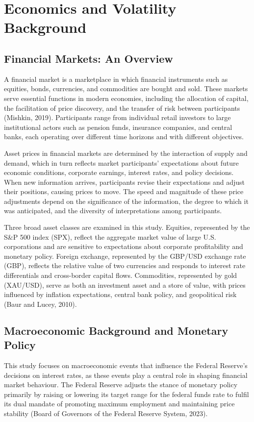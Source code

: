 \documentclass[12pt,a4paper]{report}
\begin{document}
\section{Economics and Volatility Background}
\subsection{Financial Markets: An Overview}
A financial market is a marketplace in which financial instruments such as equities, bonds, currencies, and commodities are bought and sold. These markets serve essential functions in modern economies, including the allocation of capital, the facilitation of price discovery, and the transfer of risk between participants (Mishkin, 2019). Participants range from individual retail investors to large institutional actors such as pension funds, insurance companies, and central banks, each operating over different time horizons and with different objectives.

Asset prices in financial markets are determined by the interaction of supply and demand, which in turn reflects market participants' expectations about future economic conditions, corporate earnings, interest rates, and policy decisions. When new information arrives, participants revise their expectations and adjust their positions, causing prices to move. The speed and magnitude of these price adjustments depend on the significance of the information, the degree to which it was anticipated, and the diversity of interpretations among participants.

Three broad asset classes are examined in this study. Equities, represented by the S\&P 500 index (SPX), reflect the aggregate market value of large U.S. corporations and are sensitive to expectations about corporate profitability and monetary policy. Foreign exchange, represented by the GBP/USD exchange rate (GBP), reflects the relative value of two currencies and responds to interest rate differentials and cross-border capital flows. Commodities, represented by gold (XAU/USD), serve as both an investment asset and a store of value, with prices influenced by inflation expectations, central bank policy, and geopolitical risk (Baur and Lucey, 2010).

\subsection{Macroeconomic Background and Monetary Policy}
This study focuses on macroeconomic events that influence the Federal Reserve's decisions on interest rates, as these events play a central role in shaping financial market behaviour. The Federal Reserve adjusts the stance of monetary policy primarily by raising or lowering its target range for the federal funds rate to fulfil its dual mandate of promoting maximum employment and maintaining price stability (Board of Governors of the Federal Reserve System, 2023).
\end{document}
